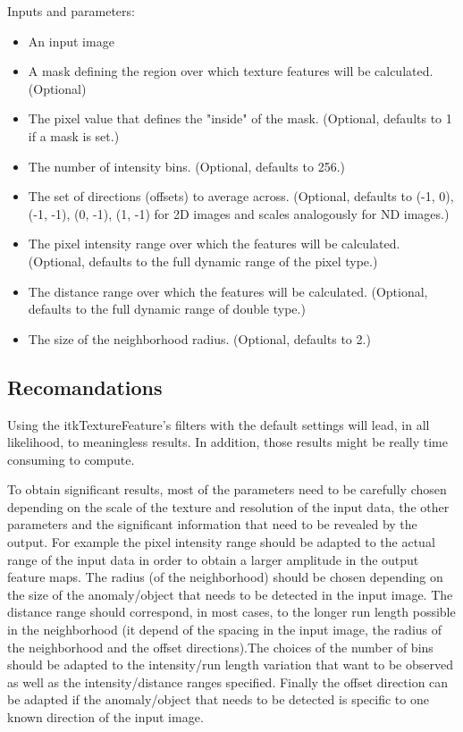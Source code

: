 \documentclass{InsightArticle}
\begin{document}
Inputs and parameters:
\begin{itemize}
 \item An input image
 \item A mask defining the region over which texture features will be calculated. (Optional)
 \item The pixel value that defines the "inside" of the mask. (Optional, defaults to 1 if a mask is set.)
 \item The number of intensity bins. (Optional, defaults to 256.)
 \item The set of directions (offsets) to average across. (Optional, defaults to {(-1, 0), (-1, -1), (0, -1), (1, -1)} for 2D images and scales analogously for ND images.)
 \item The pixel intensity range over which the features will be calculated. (Optional, defaults to the full dynamic range of the pixel type.)
 \item The distance range over which the features will be calculated. (Optional, defaults to the full dynamic range of double type.)
 \item The size of the neighborhood radius. (Optional, defaults to 2.)
\end{itemize}

\subsection{Recomandations}
\label{sec:recomandations}

Using the itkTextureFeature's filters with the default settings will lead, in all likelihood, to meaningless results. In addition, those results might be really time consuming to compute. 

To obtain significant results, most of the parameters need to be carefully chosen depending on the scale of the texture and resolution of the input data, the other parameters and the significant information that need to be revealed by the output. For example the pixel intensity range should be adapted to the actual range of the input data in order to obtain a larger amplitude in the output feature maps. The radius (of the neighborhood) should be chosen depending on the size of the anomaly/object that needs to be detected in the input image. The distance range should correspond, in most cases, to the longer run length possible in the neighborhood (it depend of the spacing in the input image, the radius of the neighborhood and the offset directions).The choices of the number of bins should be adapted to the intensity/run length variation that want to be observed as well as the intensity/distance ranges specified. Finally the offset direction can be adapted if the anomaly/object that needs to be detected is specific to one known direction of the input image.
\end{document}
